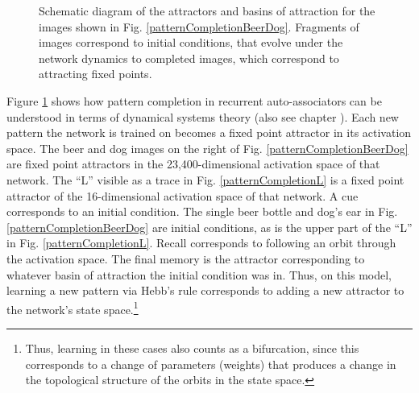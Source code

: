 \begin{figure}[h]
\centering
{}
\caption[Pamela Payne, using elements from Hertz, Krogh, and Palmer, 1991 \cite{hertz1991introduction}.]{Schematic diagram of the attractors and basins of attraction for the images shown in Fig. \ref{patternCompletionBeerDog}. Fragments of images correspond to initial conditions, that evolve under the network dynamics to completed images, which correspond to attracting fixed points.}
\label{beerDogAttractors}
\end{figure}

Figure \ref{beerDogAttractors} shows how pattern completion in recurrent auto-associators can be understood in terms of   dynamical systems theory (also see chapter ). Each new pattern the network is trained on becomes a fixed point attractor in its activation space. The beer and dog images on the right of Fig. \ref{patternCompletionBeerDog} are fixed point attractors in the 23,400-dimensional activation space of that network. The ``L'' visible as a trace in Fig. \ref{patternCompletionL} is a fixed point attractor of the 16-dimensional activation space of that network. A cue corresponds to an initial condition. The single beer bottle and dog's ear in Fig. \ref{patternCompletionBeerDog} are initial conditions, as is the upper part of the ``L'' in Fig. \ref{patternCompletionL}. Recall corresponds to following an orbit through the activation space. The final memory is the attractor corresponding to whatever basin of attraction the initial condition was in. Thus, on this model, learning a new pattern via Hebb's rule corresponds to adding a new attractor to the network's state space.\footnote{Thus, learning in these cases also counts as a bifurcation, since this corresponds to a change of parameters (weights) that produces a change in the topological structure of the orbits in the state space.}

